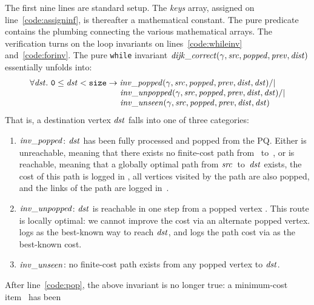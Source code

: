 
The first nine lines are standard setup. 
The \emph{keys} array, assigned on line~\ref{code:assigninf}, 
is thereafter a mathematical constant.
The pure predicate  contains the plumbing connecting the 
various mathematical arrays.
The verification turns on the loop
invariants on lines~\ref{code:whileinv} and~\ref{code:forinv}.  The pure \texttt{while} invariant $\mathit{dijk\_correct}(\gamma, \mathit{src}, \mathit{popped}, \mathit{prev}, \mathit{dist})$ essentially unfolds into:
\[
\begin{array}{l}
\forall \m{dst}.~\texttt{0} \le \m{dst} < \texttt{size} -> \m{inv\_popped}(\gamma, \m{src}, \m{popped}, \m{prev}, \m{dist}, \m{dst}) /| \null \\
\hspace{10.7em}\m{inv\_unpopped}(\gamma, \m{src}, \m{popped}, \m{prev}, \m{dist}, \m{dst}) /| \null \\
\hspace{10.7em}\m{inv\_unseen}(\gamma, \m{src}, \m{popped}, \m{prev}, \m{dist}, \m{dst})
\end{array}
\]
That is, a destination vertex $\mathit{dst}$ falls into one of three
categories:
\begin{enumerate}
\item $\mathit{inv\_popped}$: $\mathit{dst}$ has been fully processed and
popped from the PQ.
Either  is unreachable, meaning that there exists no finite-cost path from
~to~, or  is reachable, meaning that a globally optimal
path from $\mathit{src}$~to~$\mathit{dst}$ exists, the cost of this path is logged in
, all vertices visited by the path are also popped,
and the links of the path are logged in~.
\item $\mathit{inv\_unpopped}$: $\mathit{dst}$ is reachable in
one step from a popped vertex .
This route is locally optimal: we cannot
improve the cost via an alternate popped vertex.
 logs
 as the best-known way to reach $\mathit{dst}$, and 
logs the path cost via  as the best-known cost.
\item $\mathit{inv\_unseen}$: no finite-cost path exists from any popped vertex to
$\mathit{dst}$.
\end{enumerate}
After line~\ref{code:pop},
the above invariant is no longer true: a minimum-cost item~ has been
